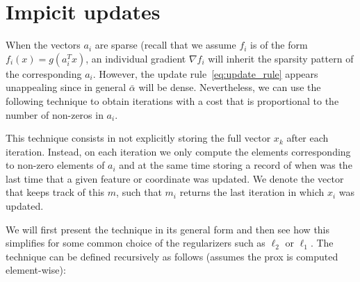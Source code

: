 \documentclass{scrartcl}
\begin{document}
\section{Impicit updates}

When the vectors $a_i$ are sparse (recall that we assume $f_i$ is of the form $f_i(x) = g(a_i^T x)$, an individual gradient $\nabla f_i$ will inherit the sparsity pattern of the corresponding $a_i$. However, the update rule~\eqref{eq:update_rule} appears unappealing since in general $\bar{\alpha}$ will be dense. Nevertheless, we can use the following technique to obtain iterations with a cost that is proportional to the number of non-zeros in $a_i$.

This technique consists in not explicitly storing the full vector $x_k$ after each iteration. Instead, on each iteration we only compute the elements corresponding to non-zero elements of $a_i$ and at the same time storing a record of when was the last time that a given feature or coordinate was updated. We denote the vector that keeps track of this $m$, such that $m_i$ returns the last iteration in which $x_i$ was updated.

We will first present the technique in its general form and then see how this simplifies for some common choice of the regularizers such as $\ell_2$ or $\ell_1$. The technique can be defined recursively as follows (assumes the prox is computed element-wise):
\end{document}
